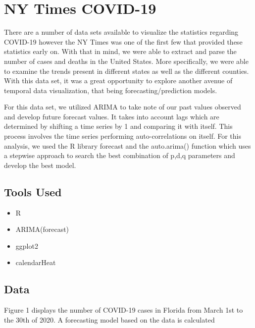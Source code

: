 \documentclass[twocolumn]{article}
\begin{document}
	\section{NY Times COVID-19}
	    There are a number of data sets available to visualize the statistics regarding COVID-19 however the NY Times was one of the first few that provided these statistics early on. With that in mind, we were able to extract and parse the number of cases and deaths in the United States. More specifically, we were able to examine the trends present in different states as well as the different counties. With this data set, it was a great opportunity to explore another avenue of temporal data visualization, that being forecasting/prediction models.\cite{nytimes}
	 
	    For this data set, we utilized ARIMA to take note of our past values observed and develop future forecast values. It takes into account lags which are determined by shifting a time series by 1 and comparing it with itself. This process involves the time series performing auto-correlations on itself. For this analysis, we used the R library forecast and the auto.arima() function which uses a stepwise approach to search the best combination of p,d,q parameters and develop the best model.\cite{arima}
    	\subsection{Tools Used}
    	    \begin{itemize}
    	        \item R
    	        \item ARIMA(forecast)
    	        \item ggplot2
    	        \item calendarHeat
    	    \end{itemize}
        
        \subsection{Data}
    
         Figure 1 displays the number of COVID-19 cases in Florida from March 1st to the 30th of 2020. A forecasting model based on the data is calculated
        
\end{document}
